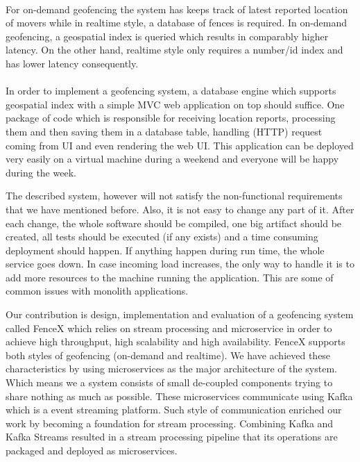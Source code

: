 \documentclass[a4]{report}
\begin{document}
    \paragraph{}
    For on-demand geofencing the system has keeps track of latest reported location of movers while in realtime
    style, a database of fences is required.
    In on-demand geofencing, a geospatial index is queried which results in comparably higher latency.
    On the other hand, realtime style only requires a number/id index and has lower latency consequently.

    \paragraph{}
    In order to implement a geofencing system, a database engine which supports geospatial index with a simple MVC
    web application on top should suffice.
    One package of code which is responsible for receiving location reports, processing them and then saving them in
    a database table, handling (HTTP) request coming from UI and even rendering the web UI.
    This application can be deployed very easily on a virtual machine during a weekend and everyone will be happy
    during the week.

    The described system, however will not satisfy the non-functional requirements that we have mentioned before.
    Also, it is not easy to change any part of it.
    After each change, the whole software should be compiled, one big artifact should be created, all tests should be
    executed (if any exists) and a time consuming deployment should happen.
    If anything happen during run time, the whole service goes down.
    In case incoming load increases, the only way to handle it is to add more resources to the machine running the
    application.
    This are some of common issues with monolith applications.

    Our contribution is design, implementation and evaluation of a geofencing system called FenceX which relies on
    stream processing and microservice in order to achieve high throughput, high scalability and high availability.
    FenceX supports both styles of geofencing (on-demand and realtime).
    We have achieved these characteristics by using microservices as the major architecture of the system.
    Which means we a system consists of small de-coupled components trying to share nothing as much as possible.
    These microservices communicate using Kafka which is a event streaming platform.
    Such style of communication enriched our work by becoming a foundation for stream processing.
    Combining Kafka and Kafka Streams resulted in a stream processing pipeline that its operations are packaged and
    deployed as microservices.
\end{document}
